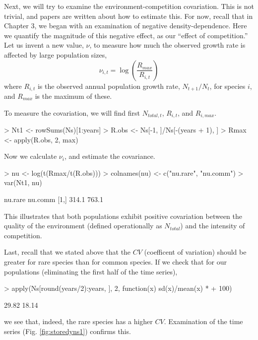 Next, we will try to examine the environment-competition covariation. This is not trivial, and papers are written about how to estimate this. For now, recall that in Chapter 3, we began with an examination of negative density-dependence. Here we quantify the magnitude of this negative effect, as our ``effect of competition.'' Let us invent a new value, $\nu$, to measure how much the observed growth rate is affected by large population sizes,
\begin{equation}
  \label{eq:compnu}
  \nu_{i,t} = \log\left(\frac{R_{max}}{R_{i,t}}\right) 
\end{equation}
where $R_{i,t}$ is the observed annual population growth rate, $N_{t+1}/N_t$, for species $i$, and $R_{max}$ is the maximum of these. 

To measure the covariation, we will find first $N_{total,t}$, $R_{i,t}$, and $R_{i,max}$.
\begin{Schunk}
\begin{Sinput}
> Nt1 <- rowSums(Ns)[1:years]
> R.obs <- Ns[-1, ]/Ns[-(years + 1), ]
> Rmax <- apply(R.obs, 2, max)
\end{Sinput}
\end{Schunk}
Now we calculate $\nu_i$, and estimate the covariance.
\begin{Schunk}
\begin{Sinput}
> nu <- log(t(Rmax/t(R.obs)))
> colnames(nu) <- c("nu.rare", "nu.comm")
> var(Nt1, nu)
\end{Sinput}
\begin{Soutput}
     nu.rare nu.comm
[1,]   314.1   763.1
\end{Soutput}
\end{Schunk}
This illustrates that  both populations exhibit positive covariation between the quality of the environment (defined operationally as $N_{total}$) and the intensity of competition.

Last, recall that we stated above that the $CV$ (coefficent of variation) should be greater for rare species than for common species. If we check that for our populations (eliminating the first half of the time series),
\begin{Schunk}
\begin{Sinput}
> apply(Ns[round(years/2):years, ], 2, function(x) sd(x)/mean(x) * 
+     100)
\end{Sinput}
\begin{Soutput}
[1] 29.82 18.14
\end{Soutput}
\end{Schunk}
we see that, indeed, the rare species has a higher $CV$. Examination of the time series (Fig. \ref{fig:storedyns1}) confirms this.

